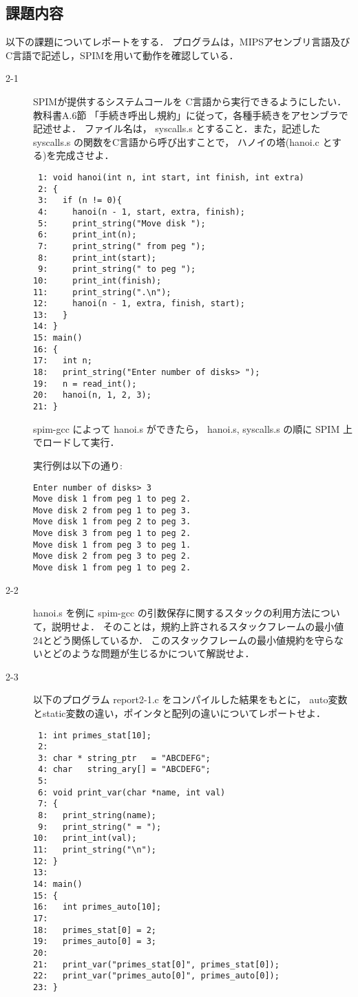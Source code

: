 \documentclass[a4j,11pt]{jarticle}
\begin{document}
\subsection{課題内容}\label{kadai}
以下の課題についてレポートをする． プログラムは，MIPSアセンブリ言語及びC言語で記述し，SPIMを用いて動作を確認している．
\begin{description}

\item[2-1]  SPIMが提供するシステムコールを C言語から実行できるようにしたい． 教科書A.6節 「手続き呼出し規約」に従って，各種手続きをアセンブラで記述せよ． ファイル名は， syscalls.s とすること．また，記述した syscalls.s の関数をC言語から呼び出すことで， ハノイの塔(hanoi.c とする)を完成させよ． 
\begin{verbatim}
 1: void hanoi(int n, int start, int finish, int extra)
 2: {
 3:   if (n != 0){
 4:     hanoi(n - 1, start, extra, finish);
 5:     print_string("Move disk ");
 6:     print_int(n);
 7:     print_string(" from peg ");
 8:     print_int(start);
 9:     print_string(" to peg ");
10:     print_int(finish);
11:     print_string(".\n");
12:     hanoi(n - 1, extra, finish, start);
13:   }
14: }
15: main()
16: {
17:   int n;
18:   print_string("Enter number of disks> ");
19:   n = read_int();
20:   hanoi(n, 1, 2, 3);
21: }
\end{verbatim}
spim-gcc によって hanoi.s ができたら， hanoi.s, syscalls.s の順に SPIM 上でロードして実行．

実行例は以下の通り:
\begin{verbatim}
Enter number of disks> 3
Move disk 1 from peg 1 to peg 2.
Move disk 2 from peg 1 to peg 3.
Move disk 1 from peg 2 to peg 3.
Move disk 3 from peg 1 to peg 2.
Move disk 1 from peg 3 to peg 1.
Move disk 2 from peg 3 to peg 2.
Move disk 1 from peg 1 to peg 2.
\end{verbatim} 

\item[2-2]hanoi.s を例に spim-gcc の引数保存に関するスタックの利用方法について，説明せよ． そのことは，規約上許されるスタックフレームの最小値24とどう関係しているか． このスタックフレームの最小値規約を守らないとどのような問題が生じるかについて解説せよ．

\item[2-3]以下のプログラム report2-1.c をコンパイルした結果をもとに， auto変数とstatic変数の違い，ポインタと配列の違いについてレポートせよ．
\begin{verbatim}
 1: int primes_stat[10];
 2: 
 3: char * string_ptr   = "ABCDEFG";
 4: char   string_ary[] = "ABCDEFG";
 5: 
 6: void print_var(char *name, int val)
 7: {
 8:   print_string(name);
 9:   print_string(" = ");
10:   print_int(val);
11:   print_string("\n");
12: }
13: 
14: main()
15: {
16:   int primes_auto[10];
17: 
18:   primes_stat[0] = 2;
19:   primes_auto[0] = 3;
20: 
21:   print_var("primes_stat[0]", primes_stat[0]);
22:   print_var("primes_auto[0]", primes_auto[0]);
23: }
\end{verbatim}


\end{description}
\end{document}
